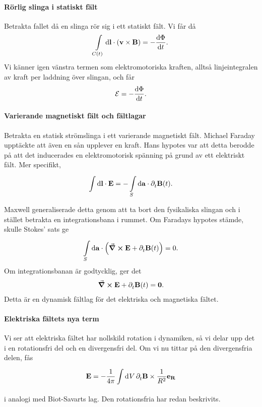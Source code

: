 \paragraph{Rörlig slinga i statiskt fält}
Betrakta fallet då en slinga rör sig i ett statiskt fält. Vi får då
\begin{align*}
	\int\limits_{C(t)}{\dd{\vb{l}}\cdot(\vb{v}\times\vb{B})} = -\dv{\Phi}{t}.
\end{align*}
Vi känner igen vänstra termen som elektromotoriska kraften, alltså linjeintegralen av kraft per laddning över slingan, och får
\begin{align*}
	\mathcal{E} = -\dv{\Phi}{t}.
\end{align*}

\paragraph{Varierande magnetiskt fält och fältlagar}
Betrakta en statisk strömslinga i ett varierande magnetiskt fält. Michael Faraday upptäckte att även en sån upplever en kraft. Hans hypotes var att detta berodde på att det inducerades en elektromotorisk spänning på grund av ett elektriskt fält. Mer specifikt,
\begin{align*}
	\int\limits_{}^{}\dd{\vb{l}}\cdot \vb{E} = -\int\limits_{S}^{}\dd{\vb{a}}\cdot \partial_{t}^{}\vb{B}(t).
\end{align*}

Maxwell generaliserade detta genom att ta bort den fysikaliska slingan och i stället betrakta en integrationsbana i rummet. Om Faradays hypotes stämde, skulle Stokes' sats ge
\begin{align*}
	\int\limits_{S}^{}\dd{\vb{a}}\cdot \left(\curl{\vb{E}} + \partial_{t}^{}\vb{B}(t)\right) = 0.
\end{align*}
Om integrationsbanan är godtycklig, ger det
\begin{align*}
	\curl{\vb{E}} + \partial_{t}^{}\vb{B}(t) = \vb{0}.
\end{align*}
Detta är en dynamisk fältlag för det elektriska och magnetiska fältet.

\paragraph{Elektriska fältets nya term}
Vi ser att elektriska fältet har nollskild rotation i dynamiken, så vi delar upp det i en rotationsfri del och en divergensfri del. Om vi nu tittar på den divergensfria delen, fås
\begin{align*}
	\vb{E} = -\frac{1}{4\pi}\int\limits_{}^{}\dd[]{V}\partial_{t}^{}\vb{B}\times\frac{1}{R^{2}}\vb{e}_{\vb{R}}
\end{align*}
i analogi med Biot-Savarts lag. Den rotationsfria har redan beskrivits.

